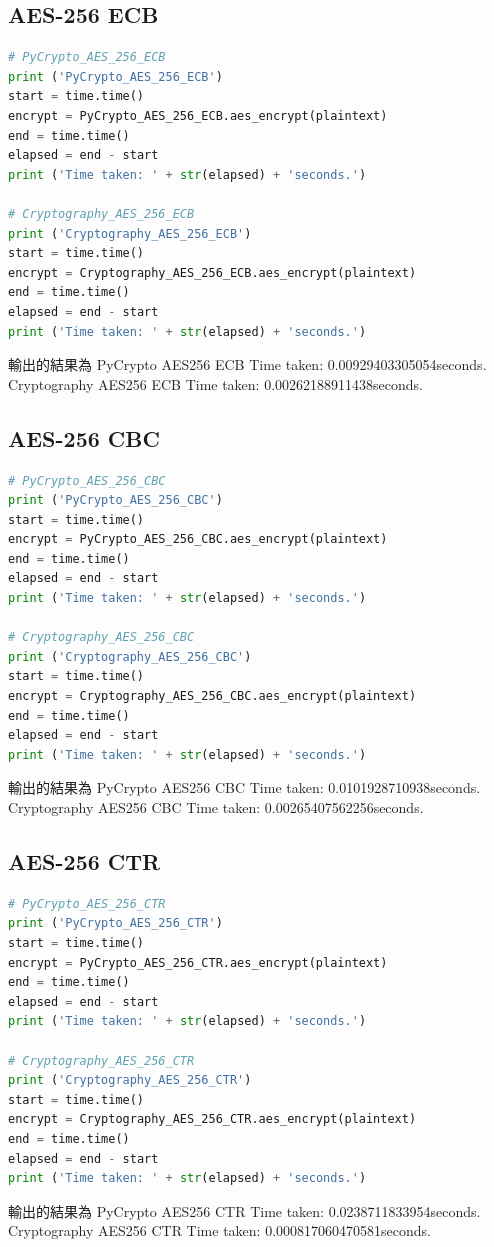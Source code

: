\documentclass[12pt,a4paper]{article}
\begin{document}
\subsection{AES-256 ECB}
{
\begin{lstlisting}[language=Python]
# PyCrypto_AES_256_ECB
print ('PyCrypto_AES_256_ECB')
start = time.time()
encrypt = PyCrypto_AES_256_ECB.aes_encrypt(plaintext)
end = time.time()
elapsed = end - start
print ('Time taken: ' + str(elapsed) + 'seconds.')

# Cryptography_AES_256_ECB
print ('Cryptography_AES_256_ECB')
start = time.time()
encrypt = Cryptography_AES_256_ECB.aes_encrypt(plaintext)
end = time.time()
elapsed = end - start
print ('Time taken: ' + str(elapsed) + 'seconds.')
\end{lstlisting}
輸出的結果為
\newline PyCrypto AES256 ECB
Time taken: 0.00929403305054seconds.
\newline Cryptography AES256 ECB
Time taken: 0.00262188911438seconds.
}

\subsection{AES-256 CBC}
{
\begin{lstlisting}[language=Python]
# PyCrypto_AES_256_CBC
print ('PyCrypto_AES_256_CBC')
start = time.time()
encrypt = PyCrypto_AES_256_CBC.aes_encrypt(plaintext)
end = time.time()
elapsed = end - start
print ('Time taken: ' + str(elapsed) + 'seconds.')

# Cryptography_AES_256_CBC
print ('Cryptography_AES_256_CBC')
start = time.time()
encrypt = Cryptography_AES_256_CBC.aes_encrypt(plaintext)
end = time.time()
elapsed = end - start
print ('Time taken: ' + str(elapsed) + 'seconds.')
\end{lstlisting}
輸出的結果為
\newline PyCrypto AES256 CBC
Time taken: 0.0101928710938seconds.
\newline Cryptography AES256 CBC
Time taken: 0.00265407562256seconds.
}

\subsection{AES-256 CTR}
{
\begin{lstlisting}[language=Python]
# PyCrypto_AES_256_CTR
print ('PyCrypto_AES_256_CTR')
start = time.time()
encrypt = PyCrypto_AES_256_CTR.aes_encrypt(plaintext)
end = time.time()
elapsed = end - start
print ('Time taken: ' + str(elapsed) + 'seconds.')

# Cryptography_AES_256_CTR
print ('Cryptography_AES_256_CTR')
start = time.time()
encrypt = Cryptography_AES_256_CTR.aes_encrypt(plaintext)
end = time.time()
elapsed = end - start
print ('Time taken: ' + str(elapsed) + 'seconds.')
\end{lstlisting}
輸出的結果為
\newline PyCrypto AES256 CTR
Time taken: 0.0238711833954seconds.
\newline Cryptography AES256 CTR
Time taken: 0.000817060470581seconds.
}
\end{document}
